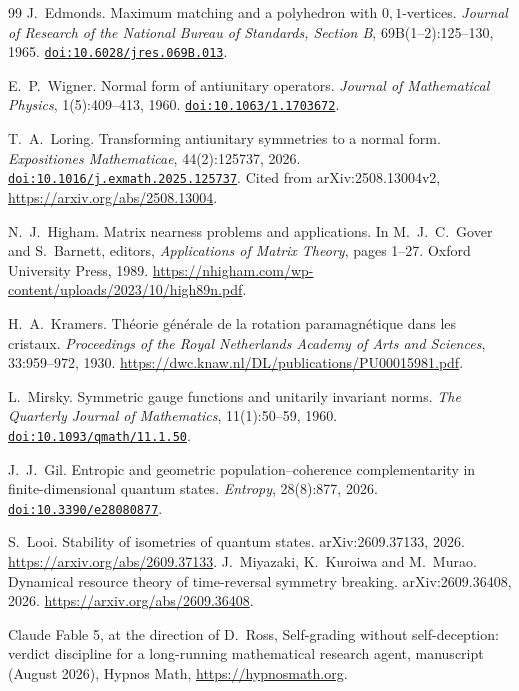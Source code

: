 \documentclass[11pt]{article}
\begin{document}
\begin{thebibliography}{99}
J.~Edmonds.
Maximum matching and a polyhedron with $0,1$-vertices.
\emph{Journal of Research of the National Bureau of Standards, Section B},
69B(1--2):125--130, 1965.
\href{https://doi.org/10.6028/jres.069B.013}{\nolinkurl{doi:10.6028/jres.069B.013}}.

E.~P.~Wigner.
Normal form of antiunitary operators.
\emph{Journal of Mathematical Physics}, 1(5):409--413, 1960.
\href{https://doi.org/10.1063/1.1703672}{\nolinkurl{doi:10.1063/1.1703672}}.

T.~A.~Loring.
Transforming antiunitary symmetries to a normal form.
\emph{Expositiones Mathematicae}, 44(2):125737, 2026.
\href{https://doi.org/10.1016/j.exmath.2025.125737}{\nolinkurl{doi:10.1016/j.exmath.2025.125737}}.
Cited from arXiv:2508.13004v2, \url{https://arxiv.org/abs/2508.13004}.

N.~J.~Higham.
Matrix nearness problems and applications.
In M.~J.~C.~Gover and S.~Barnett, editors,
\emph{Applications of Matrix Theory}, pages 1--27.
Oxford University Press, 1989.
\url{https://nhigham.com/wp-content/uploads/2023/10/high89n.pdf}.

H.~A.~Kramers.
Th\'eorie g\'en\'erale de la rotation paramagn\'etique dans les cristaux.
\emph{Proceedings of the Royal Netherlands Academy of Arts and Sciences},
33:959--972, 1930.
\url{https://dwc.knaw.nl/DL/publications/PU00015981.pdf}.

L.~Mirsky.
Symmetric gauge functions and unitarily invariant norms.
\emph{The Quarterly Journal of Mathematics}, 11(1):50--59, 1960.
\href{https://doi.org/10.1093/qmath/11.1.50}{\nolinkurl{doi:10.1093/qmath/11.1.50}}.

J.~J.~Gil.
Entropic and geometric population--coherence complementarity in
finite-dimensional quantum states.
\emph{Entropy}, 28(8):877, 2026.
\href{https://doi.org/10.3390/e28080877}{\nolinkurl{doi:10.3390/e28080877}}.

S.~Looi.
Stability of isometries of quantum states.
arXiv:2609.37133, 2026.
\url{https://arxiv.org/abs/2609.37133}.
J.~Miyazaki, K.~Kuroiwa and M.~Murao.
Dynamical resource theory of time-reversal symmetry breaking.
arXiv:2609.36408, 2026.
\url{https://arxiv.org/abs/2609.36408}.

 Claude Fable 5, at the direction of D.~Ross, Self-grading without self-deception: verdict discipline for a long-running mathematical research agent, manuscript (August 2026), Hypnos Math, \url{https://hypnosmath.org}.
\end{thebibliography}
\end{document}
